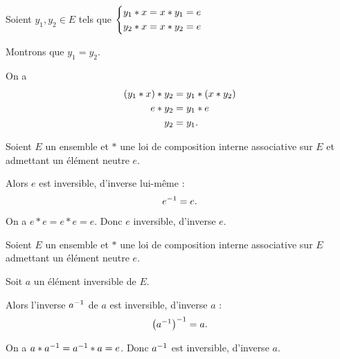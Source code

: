 \begin{dem}
Soient \(y_1,y_2\in E\) tels que \(\begin{dcases}y_1*x=x*y_1=e \\ y_2*x=x*y_2=e\end{dcases}\)

Montrons que \(y_1=y_2\).

On a \[\begin{aligned}
\left(y_1*x\right)*y_2&=y_1*\left(x*y_2\right) \\
e*y_2&=y_1*e \\
y_2&=y_1.
\end{aligned}\]
\end{dem}

\begin{ex}
Soient \(E\) un ensemble et \(*\) une loi de composition interne associative sur \(E\) et admettant un élément neutre \(e\).

Alors \(e\) est inversible, d'inverse lui-même : \[e^{-1}=e.\]
\end{ex}

\begin{dem}
On a \(e*e=e*e=e\). Donc \(e\) inversible, d'inverse \(e\).
\end{dem}

\begin{ex}
Soient \(E\) un ensemble et \(*\) une loi de composition interne associative sur \(E\) admettant un élément neutre \(e\).

Soit \(a\) un élément inversible de \(E\).

Alors l'inverse \(a^{-1}\) de \(a\) est inversible, d'inverse \(a\) : \[\left(a^{-1}\right)^{-1}=a.\]
\end{ex}

\begin{dem}
On a \(a*a^{-1}=a^{-1}*a=e\). Donc \(a^{-1}\) est inversible, d'inverse \(a\).
\end{dem}

